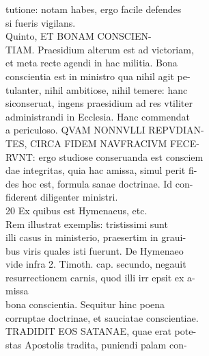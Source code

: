 \documentclass{article}
\begin{document}
\begin{pages}
                tutione: notam habes, ergo facile defendes \\
                si fueris vigilans. \\
                Quinto, ET BONAM CONSCIEN- \\
                TIAM. Praesidium alterum est ad victoriam, \\
                et meta recte agendi in hac militia. Bona \\
                conscientia est in ministro qua nihil agit pe- \\
                tulanter, nihil ambitiose, nihil temere: hanc \\
                siconseruat, ingens praesidium ad res vtiliter \\
                administrandi in Ecclesia. Hanc commendat \\
                a periculoso. QVAM NONNVLLI REPVDIAN- \\
                TES, CIRCA FIDEM NAVFRACIVM FECE- \\
                RVNT: ergo studiose conseruanda est consciem \\
                dae integritas, quia hac amissa, simul perit fi- \\
                des hoc est, formula sanae doctrinae. Id con- \\
                fiderent diligenter ministri. \\
                20 Ex quibus est Hymenaeus, etc. \\
                Rem illustrat exemplis: tristissimi sunt \\
                illi casus in ministerio, praesertim in graui- \\
                bus viris quales isti fuerunt. De Hymenaeo \\
                vide infra 2. Timoth. cap. secundo, negauit \\
                resurrectionem carnis, quod illi irr epsit ex a- \\
                missa \\
                bona conscientia. Sequitur hinc poena \\
                corruptae doctrinae, et sauciatae conscientiae. \\
                TRADIDIT EOS SATANAE, quae erat pote- \\
                stas Apostolis tradita, puniendi palam con- \\

\end{pages}
\end{document}
